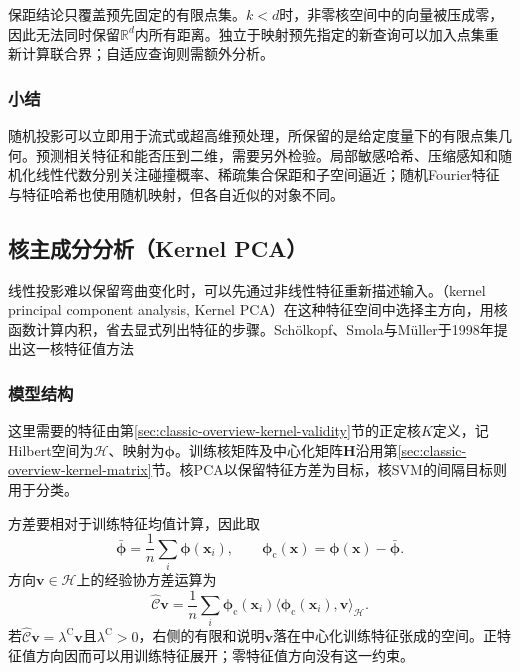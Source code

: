保距结论只覆盖预先固定的有限点集。$k<d$时，非零核空间中的向量被压成零，因此无法同时保留$\mathbb{R}^{d}$内所有距离。独立于映射预先指定的新查询可以加入点集重新计算联合界；自适应查询则需额外分析。

\subsubsection{小结}
\label{sec:dim-rp-summary}

随机投影可以立即用于流式或超高维预处理，所保留的是给定度量下的有限点集几何。预测相关特征和能否压到二维，需要另外检验。局部敏感哈希、压缩感知和随机化线性代数分别关注碰撞概率、稀疏集合保距和子空间逼近；随机Fourier特征与特征哈希也使用随机映射，但各自近似的对象不同。

\subsection{核主成分分析（Kernel PCA）}
\label{sec:dim-kpca}

线性投影难以保留弯曲变化时，可以先通过非线性特征重新描述输入。（kernel principal component analysis, Kernel PCA）在这种特征空间中选择主方向，用核函数计算内积，省去显式列出特征的步骤。Schölkopf、Smola与Müller于1998年提出这一核特征值方法

\subsubsection{模型结构}

这里需要的特征由第\ref{sec:classic-overview-kernel-validity}节的正定核$K$定义，记Hilbert空间为$\mathcal{H}$、映射为$\bm{\phi}$。训练核矩阵及中心化矩阵$\bm{H}$沿用第\ref{sec:classic-overview-kernel-matrix}节。核PCA以保留特征方差为目标，核SVM的间隔目标则用于分类。

方差要相对于训练特征均值计算，因此取
\[
  \bar{\bm{\phi}}=\frac1n\sum_i\bm{\phi}(\bm{x}_i),
  \qquad
  \bm{\phi}_{\mathrm{c}}(\bm{x})=\bm{\phi}(\bm{x})-\bar{\bm{\phi}}.
\]
方向$\bm{v}\in\mathcal{H}$上的经验协方差运算为
\begin{equation}
  \label{eq:dim-kpca-covariance}
  \widehat{\mathcal{C}}\bm{v}
  =\frac1n\sum_i
    \bm{\phi}_{\mathrm{c}}(\bm{x}_i)
    \langle\bm{\phi}_{\mathrm{c}}(\bm{x}_i),\bm{v}\rangle_{\mathcal{H}}.
\end{equation}
若$\widehat{\mathcal{C}}\bm{v}=\lambda^{\mathrm{C}}\bm{v}$且$\lambda^{\mathrm{C}}>0$，右侧的有限和说明$\bm{v}$落在中心化训练特征张成的空间。正特征值方向因而可以用训练特征展开；零特征值方向没有这一约束。

